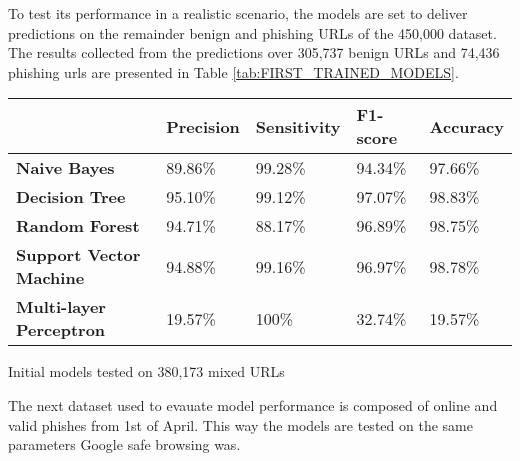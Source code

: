 To test its performance in a realistic scenario, the models are set to deliver predictions on the remainder benign and phishing URLs of the 450,000 dataset. The results collected from the predictions over 305,737 benign URLs and 74,436 phishing urls are presented in Table \ref{tab:FIRST_TRAINED_MODELS}.


\begin{singlespace}
	\begin{center}
		\label{tab:FIRST_TRAINED_MODELS}
		\begin{tabular}{ | m{13em} | m{5em} | m{5em} | m{5em} | m{5em} | }
			\hline
			                                & \textbf{Precision} & \textbf{Sensitivity} & \textbf{F1-score} & \textbf{Accuracy} \\
			\hline
			\textbf{Naive Bayes}            & 89.86\%            & 99.28\%              & 94.34\%           & 97.66\%           \\
			\hline
			\textbf{Decision Tree}          & 95.10\%            & 99.12\%              & 97.07\%           & 98.83\%           \\
			\hline
			\textbf{Random Forest}          & 94.71\%            & 88.17\%              & 96.89\%           & 98.75\%           \\
			\hline
			\textbf{Support Vector Machine} & 94.88\%            & 99.16\%              & 96.97\%           & 98.78\%           \\
			\hline
			\textbf{Multi-layer Perceptron} & 19.57\%            & 100\%                & 32.74\%           & 19.57\%           \\
			\hline
		\end{tabular}
		\captionsetup{type=table}\caption{Initial models tested on 380,173 mixed URLs}
	\end{center}
\end{singlespace}


The next dataset used to evauate model performance is composed of online and valid phishes from 1st of April. This way the models are tested on the same parameters Google safe browsing was.

